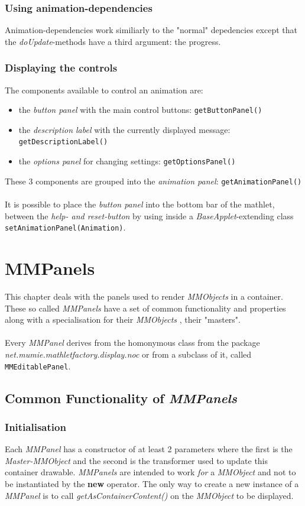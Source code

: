 \documentclass[a4paper,12pt]{book}
\newcommand{\mmo}{\emph{MMObject }}
\newcommand{\mmos}{\emph{MMObjects }}
\newcommand{\mmp}{\emph{MMPanel }}
\newcommand{\mmps}{\emph{MMPanels }}
\begin{document}
    \subsection{Using animation-dependencies}
      Animation-dependencies work similiarly to the "normal" depedencies except that
      the \textit{doUpdate}-methods have a third argument: the progress.
      
    \subsection{Displaying the controls}
      The components available to control an animation are:
      \begin{itemize}
        \item the {\it button panel} with the main control buttons: {\tt getButtonPanel()}
        \item the {\it description label} with the currently displayed message: {\tt getDescriptionLabel()}
        \item the {\it options panel} for changing settings: {\tt getOptionsPanel()}
      \end{itemize}
      These 3 components are grouped into the {\it animation panel}: {\tt getAnimationPanel()}
      \\\\
      It is possible to place the {\it button panel} into the bottom bar of the mathlet,
      between the {\it help- and reset-button} by using inside a {\it BaseApplet}-extending class
      {\tt setAnimationPanel(Animation)}.
  
\chapter{MMPanels}
  This chapter deals with the panels used to render \mmos in a container.
  These so called \mmps have a set of common functionality and properties along with a specialisation
  for their \mmos, their "masters".\\\\
  Every \mmp derives from the homonymous class from the package\\ \textit{net.mumie.mathletfactory.display.noc}
  or from a subclass of it, called {\tt MMEditablePanel}.
  
  \section{Common Functionality of \mmps}
    \subsection{Initialisation}
    Each \mmp has a constructor of at least 2 parameters where the first is the \textit{Master-MMObject} 
    and the second is the transformer used to update this container drawable.
    \mmps are intended to work \textit{for} a \mmo and not to be instantiated by the \textbf{new} operator.
    The only way to create a new instance of a \mmp is to call \textit{getAsContainerContent()} on the \mmo
    to be displayed.
    
\end{document}
